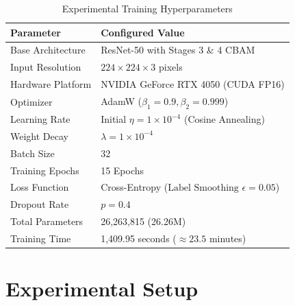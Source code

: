 \documentclass[conference]{IEEEtran}
\begin{document}
\begin{table}[!t]
\centering
\caption{Experimental Training Hyperparameters}
\label{tab:hyperparams}
\footnotesize
\setlength{\tabcolsep}{5pt}
\begin{tabular*}{\columnwidth}{@{\extracolsep{\fill}}ll}
\toprule
\textbf{Parameter} & \textbf{Configured Value} \\
\midrule
Base Architecture & ResNet-50 with Stages 3 \& 4 CBAM \\
Input Resolution & $224 \times 224 \times 3$ pixels \\
Hardware Platform & NVIDIA GeForce RTX 4050 (CUDA FP16) \\
Optimizer & AdamW ($\beta_1 = 0.9, \beta_2 = 0.999$) \\
Learning Rate & Initial $\eta = 1 \times 10^{-4}$ (Cosine Annealing) \\
Weight Decay & $\lambda = 1 \times 10^{-4}$ \\
Batch Size & 32 \\
Training Epochs & 15 Epochs \\
Loss Function & Cross-Entropy ($\text{Label Smoothing } \epsilon = 0.05$) \\
Dropout Rate & $p = 0.4$ \\
Total Parameters & 26,263,815 (26.26M) \\
Training Time & 1,409.95 seconds ($\approx 23.5$ minutes) \\
\bottomrule
\end{tabular*}
\end{table}

\section{Experimental Setup}
\label{sec:experiments}
\end{document}
